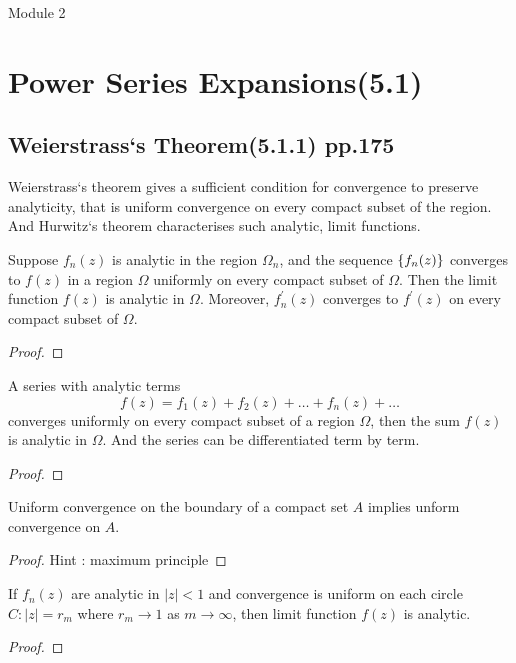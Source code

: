 \pagebreak
{\Large Module 2}
\section{Power Series Expansions(5.1)}
\subsection{Weierstrass`s Theorem(5.1.1) pp.175}
\begin{important}
	Weierstrass`s theorem gives a sufficient condition for convergence to preserve analyticity, that is uniform convergence on every compact subset of the region. 
	And Hurwitz`s theorem characterises such analytic, limit functions.
\end{important}
\begin{theorem}[Weierstrass]
	Suppose $f_n(z)$ is analytic in the region $\Omega_n$, and the sequence $\left\{f_n(z)\right\}$ converges to $f(z)$ in a region $\Omega$ uniformly on every compact subset of $\Omega$. Then the limit function $f(z)$ is analytic in $\Omega$. Moreover, $f_n^\prime(z)$ converges to $f^\prime(z)$ on every compact subset of $\Omega$.
\end{theorem}
\begin{proof}
\end{proof}

\begin{remark}
	A series with analytic terms
	\[ f(z) = f_1(z) + f_2(z) + \dots + f_n(z) + \dots \]
	converges uniformly on every compact subset of a region $\Omega$, then the sum $f(z)$ is analytic in $\Omega$. And the series can be differentiated term by term.
\end{remark}
\begin{proof}
\end{proof}
\begin{remark}
	Uniform convergence on the boundary of a compact set $A$ implies unform convergence on $A$.
\end{remark}
\begin{proof}
	Hint : maximum principle
\end{proof}

\begin{remark}
	If $f_n(z)$ are analytic in $|z|<1$ and convergence is uniform on each circle $C : |z| = r_m$ where $r_m \to 1$ as $m \to \infty$, then limit function $f(z)$ is analytic.
\end{remark}
\begin{proof}
\end{proof}

